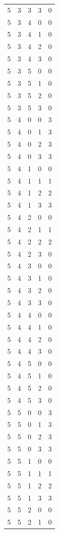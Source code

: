 \begin{longtable}{rrrrr}
5 & 3 & 3 & 3 & 0 \\
5 & 3 & 4 & 0 & 0 \\
5 & 3 & 4 & 1 & 0 \\
5 & 3 & 4 & 2 & 0 \\
5 & 3 & 4 & 3 & 0 \\
5 & 3 & 5 & 0 & 0 \\
5 & 3 & 5 & 1 & 0 \\
5 & 3 & 5 & 2 & 0 \\
5 & 3 & 5 & 3 & 0 \\
5 & 4 & 0 & 0 & 3 \\
5 & 4 & 0 & 1 & 3 \\
5 & 4 & 0 & 2 & 3 \\
5 & 4 & 0 & 3 & 3 \\
5 & 4 & 1 & 0 & 0 \\
5 & 4 & 1 & 1 & 1 \\
5 & 4 & 1 & 2 & 2 \\
5 & 4 & 1 & 3 & 3 \\
5 & 4 & 2 & 0 & 0 \\
5 & 4 & 2 & 1 & 1 \\
5 & 4 & 2 & 2 & 2 \\
5 & 4 & 2 & 3 & 0 \\
5 & 4 & 3 & 0 & 0 \\
5 & 4 & 3 & 1 & 0 \\
5 & 4 & 3 & 2 & 0 \\
5 & 4 & 3 & 3 & 0 \\
5 & 4 & 4 & 0 & 0 \\
5 & 4 & 4 & 1 & 0 \\
5 & 4 & 4 & 2 & 0 \\
5 & 4 & 4 & 3 & 0 \\
5 & 4 & 5 & 0 & 0 \\
5 & 4 & 5 & 1 & 0 \\
5 & 4 & 5 & 2 & 0 \\
5 & 4 & 5 & 3 & 0 \\
5 & 5 & 0 & 0 & 3 \\
5 & 5 & 0 & 1 & 3 \\
5 & 5 & 0 & 2 & 3 \\
5 & 5 & 0 & 3 & 3 \\
5 & 5 & 1 & 0 & 0 \\
5 & 5 & 1 & 1 & 1 \\
5 & 5 & 1 & 2 & 2 \\
5 & 5 & 1 & 3 & 3 \\
5 & 5 & 2 & 0 & 0 \\
5 & 5 & 2 & 1 & 0 \\

\end{longtable}
